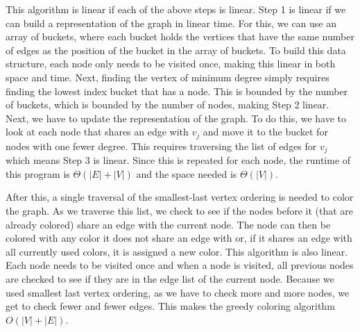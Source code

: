 \documentclass{article}
\begin{document}
        This algorithm is linear if each of the above steps is linear. Step 1 is linear if we can build a representation of the graph in linear time. For this, we can use an array of buckets, where each bucket holds the vertices that have the same number of edges as the position of the bucket in the array of buckets. To build this data structure, each node only needs to be visited once, making this linear in both space and time. Next, finding the vertex of minimum degree simply requires finding the lowest index bucket that has a node. This is bounded by the number of buckets, which is bounded by the number of nodes, making Step 2 linear. Next, we have to update the representation of the graph. To do this, we have to look at each node that shares an edge with $v_j$ and move it to the bucket for nodes with one fewer degree. This requires traversing the list of edges for $v_j$ which means Step 3 is linear. Since this is repeated for each node, the runtime of this program is $\Theta\left(|E| + |V|\right)$ and the space needed is $\Theta(|V|)$.
        \par
        After this, a single traversal of the smallest-last vertex ordering is needed to color the graph. As we traverse this list, we check to see if the nodes before it (that are already colored) share an edge with the current node. The node can then be colored with any color it does not share an edge with or, if it shares an edge with all currently used colors, it is assigned a new color. This algorithm is also linear. Each node needs to be visited once and when a node is visited, all previous nodes are checked to see if they are in the edge list of the current node. Because we used smallest last vertex ordering, as we have to check more and more nodes, we get to check fewer and fewer edges. This makes the greedy coloring algorithm $O(|V| + |E|)$.
\end{document}
